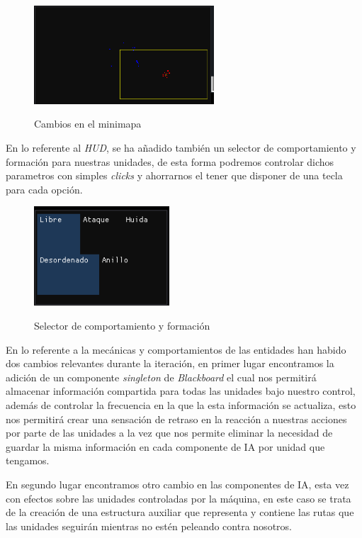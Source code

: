 \begin{figure}[ht]
\centering
\includegraphics[width=0.6\textwidth]{imagenes/diario_desarrollo/minimap2.png}\\
\caption{Cambios en el minimapa}
\label{fig:minimap2}
\end{figure}

En lo referente al \textit{HUD}, se ha añadido también un selector de comportamiento y formación
para nuestras unidades, de esta forma podremos controlar dichos parametros con simples \textit{clicks}
y ahorrarnos el tener que disponer de una tecla para cada opción. 

\begin{figure}[ht]
\centering
\includegraphics[width=0.45\textwidth]{imagenes/diario_desarrollo/eleccion_b.png}\\
\caption{Selector de comportamiento y formación}
\label{fig:hud_selec}
\end{figure}

En lo referente a la mecánicas y comportamientos de las entidades han habido dos cambios relevantes durante
la iteración, en primer lugar encontramos la adición de un componente \textit{singleton} de \textit{Blackboard}
el cual nos permitirá almacenar información compartida para todas las unidades bajo nuestro control, además de
controlar la frecuencia en la que la esta información se actualiza, esto nos permitirá crear una sensación
de retraso en la reacción a nuestras acciones por parte de las unidades a la vez que nos permite eliminar
la necesidad de guardar la misma información en cada componente de \ac{IA} por unidad que tengamos.

En segundo lugar encontramos otro cambio en las componentes de \ac{IA}, esta vez con efectos sobre las unidades
controladas por la máquina, en este caso se trata de la creación de una estructura auxiliar que representa 
y contiene las rutas que las unidades seguirán mientras no estén peleando contra nosotros.

